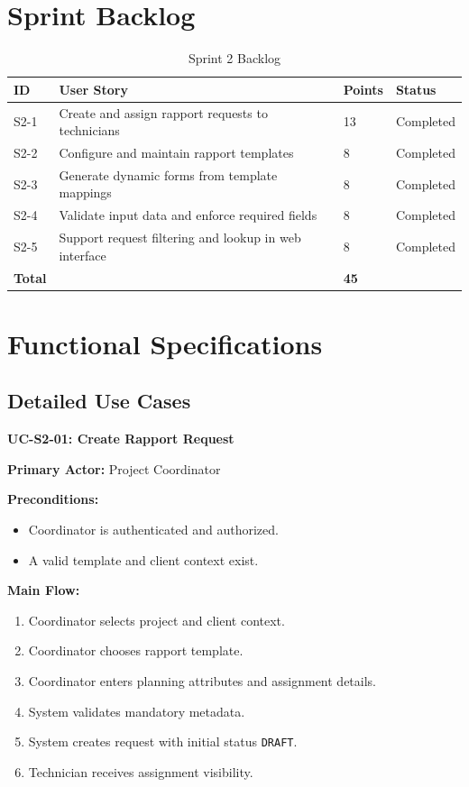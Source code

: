 \section{Sprint Backlog}

\begin{table}[H]
\centering
\caption{Sprint 2 Backlog}
\label{tab:sprint2_backlog}
\begin{tabularx}{\textwidth}{|l|X|l|l|}
\hline
\textbf{ID} & \textbf{User Story} & \textbf{Points} & \textbf{Status} \\
\hline
S2-1 & Create and assign rapport requests to technicians & 13 & Completed \\
\hline
S2-2 & Configure and maintain rapport templates & 8 & Completed \\
\hline
S2-3 & Generate dynamic forms from template mappings & 8 & Completed \\
\hline
S2-4 & Validate input data and enforce required fields & 8 & Completed \\
\hline
S2-5 & Support request filtering and lookup in web interface & 8 & Completed \\
\hline
\textbf{Total} & & \textbf{45} & \\
\hline
\end{tabularx}
\end{table}

\section{Functional Specifications}

\subsection{Detailed Use Cases}

\textbf{UC-S2-01: Create Rapport Request}

\textbf{Primary Actor:} Project Coordinator

\textbf{Preconditions:}
\begin{itemize}
\item Coordinator is authenticated and authorized.
\item A valid template and client context exist.
\end{itemize}

\textbf{Main Flow:}
\begin{enumerate}
\item Coordinator selects project and client context.
\item Coordinator chooses rapport template.
\item Coordinator enters planning attributes and assignment details.
\item System validates mandatory metadata.
\item System creates request with initial status \texttt{DRAFT}.
\item Technician receives assignment visibility.
\end{enumerate}

